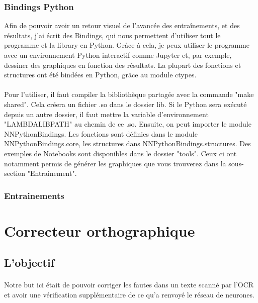 \documentclass{article}
\begin{document}
\subsubsection{Bindings Python}
Afin de pouvoir avoir un retour visuel de l’avancée des entraînements, et des résultats, j’ai écrit des Bindings, qui nous permettent d’utiliser tout le programme et la library en Python. Grâce à cela, je peux utiliser le programme avec un environnement Python interactif comme Jupyter et, par exemple, dessiner des graphiques en fonction des résultats.
La plupart des fonctions et structures ont été bindées en Python, grâce au module ctypes.
\paragraph{}Pour l’utiliser, il faut compiler la bibliothèque partagée avec la commande "make shared".
Cela créera un fichier .so dans le dossier lib.
Si le Python sera exécuté depuis un autre dossier, il faut mettre la variable d’environnement "LAMBDALIBPATH" au chemin de ce .so.
Ensuite, on peut importer le module NNPythonBindings.
Les fonctions sont définies dans le module NNPythonBindings.core, les structures dans NNPythonBindings.structures.
Des exemples de Notebooks sont disponibles dans le dossier "tools". Ceux ci ont notamment permis de générer les graphiques que vous trouverez dans la sous-section "Entrainement".



\subsubsection{Entrainements}



\newpage
{}
\section{Correcteur orthographique}

\subsection{L'objectif}

\paragraph{}Notre but ici était de pouvoir corriger les fautes dans un texte scanné par l’OCR et avoir une vérification supplémentaire de ce qu’a renvoyé le réseau de neurones.
\end{document}
